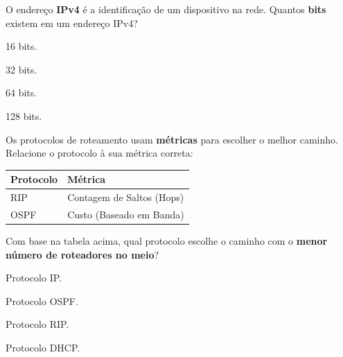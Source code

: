 \documentclass[12pt]{modelo/prova2}
\begin{document}
\maketitle

\question[1.0] O endereço \textbf{IPv4} é a identificação de um dispositivo na rede. Quantos \textbf{bits} existem em um endereço IPv4?
\begin{choices}
    \item 16 bits.
    \item 32 bits.
    \item 64 bits.
    \item 128 bits.
\end{choices}

\question[1.0] Os protocolos de roteamento usam \textbf{métricas} para escolher o melhor caminho. Relacione o protocolo à sua métrica correta:

\begin{center}
\begin{tabular}{ |p{2cm}|p{6cm}| } 
 \hline
 \textbf{Protocolo}& \textbf{Métrica} \\ 
 \hline
 RIP  & Contagem de Saltos (Hops) \\ 
 OSPF & Custo (Baseado em Banda) \\ 
 \hline
\end{tabular}
\end{center}
Com base na tabela acima, qual protocolo escolhe o caminho com o \textbf{menor número de roteadores no meio}?

\begin{choices}
\item Protocolo IP.
\item Protocolo OSPF.
\item Protocolo RIP.
\item Protocolo DHCP.
\end{choices}
\end{document}

